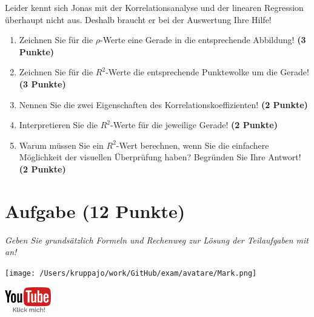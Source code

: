 \documentclass[a4paper, 9pt]{scrartcl}\usepackage[]{graphicx}\usepackage[]{xcolor}
\begin{document}
\vspace{2Ex}

Leider kennt sich Jonas mit der Korrelationsanalyse und der linearen Regression überhaupt nicht aus. Deshalb braucht er bei der Auswertung Ihre Hilfe!

\begin{enumerate}
\item Zeichnen Sie für die $\rho$-Werte eine Gerade in die entsprechende Abbildung! \textbf{(3 Punkte)}
\item Zeichnen Sie für die $R^2$-Werte die entsprechende Punktewolke um die Gerade! \textbf{(3 Punkte)}
\item Nennen Sie die zwei Eigenschaften des Korrelationskoeffizienten! \textbf{(2 Punkte)}
\item Interpretieren Sie die $R^2$-Werte für die jeweilige Gerade! \textbf{(2 Punkte)}
\item Warum müssen Sie ein $R^2$-Wert berechnen, wenn Sie die einfachere Möglichkeit der visuellen Überprüfung haben? Begründen Sie Ihre Antwort! \textbf{(2 Punkte)}
\end{enumerate}
 
\clearpage

\section{Aufgabe \hfill (12 Punkte)}

\textit{Geben Sie grundsätzlich Formeln und Rechenweg zur Lösung der Teilaufgaben mit an!} \\[1Ex]
 

 
\begin{minipage}[t]{0.5\textwidth}
\texttt{[image: /Users/kruppajo/work/GitHub/exam/avatare/Mark.png]}
\end{minipage}
\begin{minipage}[t]{0.5\textwidth}
\hfill
\href{https://youtu.be/2QJa19ZwLls}{\includegraphics[width = 2cm]{img/youtube}}
\end{minipage}
\vspace{-3ex}
\end{document}
